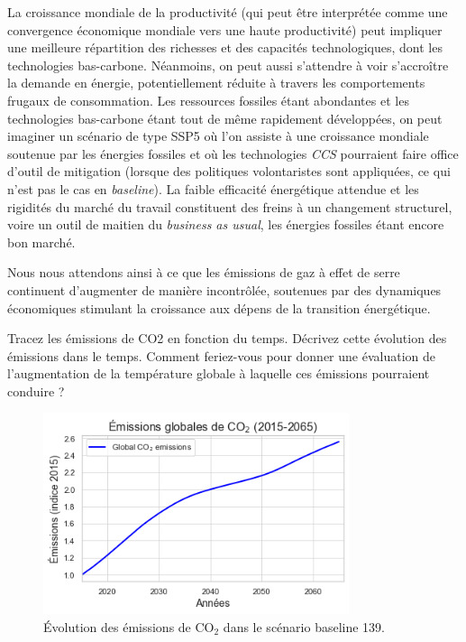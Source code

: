 \documentclass[a4,11pt]{aleph-notas}
\newcommand{\ans}[1]{
\begin{mdframed}[
    roundcorner=10pt,     %
    backgroundcolor=gray!20, %
    linecolor=black,      %
    linewidth=1pt,        %
    innertopmargin=10pt,  %
    innerbottommargin=10pt, %
    innerleftmargin=10pt,  %
    innerrightmargin=10pt  %
]
#1
\end{mdframed}
}
\begin{document}
La croissance mondiale de la productivité (qui peut être interprétée comme une convergence économique mondiale vers une haute productivité) peut impliquer une meilleure répartition des richesses et des capacités technologiques, dont les technologies bas-carbone. Néanmoins, on peut aussi s'attendre à voir s'accroître la demande en énergie, potentiellement réduite à travers les comportements frugaux de consommation. Les ressources fossiles étant abondantes et les technologies bas-carbone étant tout de même rapidement développées, on peut imaginer un scénario de type SSP5 où l'on assiste à une croissance mondiale soutenue par les énergies fossiles et où les technologies \textit{CCS} pourraient faire office d'outil de mitigation (lorsque des politiques volontaristes sont appliquées, ce qui n'est pas le cas en \textit{baseline}). La faible efficacité énergétique attendue et les rigidités du marché du travail constituent des freins à un changement structurel, voire un outil de maitien du \textit{business as usual}, les énergies fossiles étant encore bon marché. 

Nous nous attendons ainsi à ce que les émissions de gaz à effet de serre continuent d'augmenter de manière incontrôlée, soutenues par des dynamiques économiques stimulant la croissance aux dépens de la transition énergétique.

\vspace{0.5 cm}

\ans{Tracez les émissions de CO2 en fonction du temps. 
Décrivez cette évolution des émissions dans le temps. Comment feriez-vous pour donner une évaluation de l’augmentation de la température globale à laquelle ces émissions pourraient conduire ?}

\begin{figure}[H]
    \centering
    \includegraphics[width=0.8\textwidth]{images_IMACLIM/co2_baseline.png}
    \caption{Évolution des émissions de CO$_2$ dans le scénario baseline 139.}
    \label{fig:co2_baseline}
\end{figure}
\end{document}
